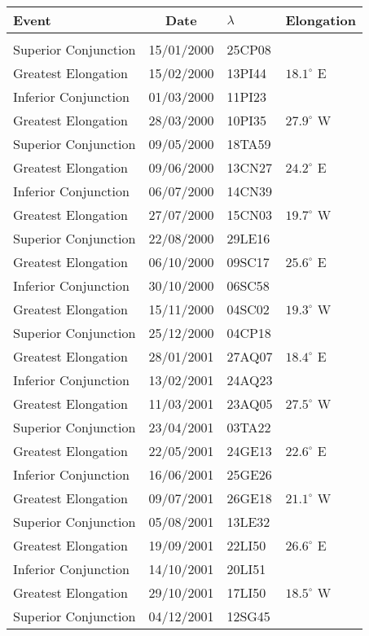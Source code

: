 \newpage
\begin{table}\centering
{\small\begin{tabular}{lcll}
Event & Date & $\lambda$& Elongation \\\hline
&&&\\[-1.75ex]
Superior Conjunction & 15/01/2000 & 25CP08&\\
Greatest Elongation & 15/02/2000 & 13PI44 & $18.1^\circ$ E\\
Inferior Conjunction & 01/03/2000 & 11PI23&\\
Greatest Elongation & 28/03/2000 & 10PI35 & $27.9^\circ$ W\\
Superior Conjunction & 09/05/2000 & 18TA59&\\
Greatest Elongation & 09/06/2000 & 13CN27 & $24.2^\circ$ E\\
Inferior Conjunction & 06/07/2000 & 14CN39&\\
Greatest Elongation & 27/07/2000 & 15CN03 & $19.7^\circ$ W\\
Superior Conjunction & 22/08/2000 & 29LE16&\\
Greatest Elongation & 06/10/2000 & 09SC17 & $25.6^\circ$ E\\
Inferior Conjunction & 30/10/2000 & 06SC58&\\
Greatest Elongation & 15/11/2000 & 04SC02 & $19.3^\circ$ W\\
Superior Conjunction & 25/12/2000 & 04CP18&\\
Greatest Elongation & 28/01/2001 & 27AQ07 & $18.4^\circ$ E\\
Inferior Conjunction & 13/02/2001 & 24AQ23&\\
Greatest Elongation & 11/03/2001 & 23AQ05 & $27.5^\circ$ W\\
Superior Conjunction & 23/04/2001 & 03TA22&\\
Greatest Elongation & 22/05/2001 & 24GE13 & $22.6^\circ$ E\\
Inferior Conjunction & 16/06/2001 & 25GE26&\\
Greatest Elongation & 09/07/2001 & 26GE18 & $21.1^\circ$ W\\
Superior Conjunction & 05/08/2001 & 13LE32&\\
Greatest Elongation & 19/09/2001 & 22LI50 & $26.6^\circ$ E\\
Inferior Conjunction & 14/10/2001 & 20LI51&\\
Greatest Elongation & 29/10/2001 & 17LI50 & $18.5^\circ$ W\\
Superior Conjunction & 04/12/2001 & 12SG45&\\

\end{tabular}}
\end{table}
